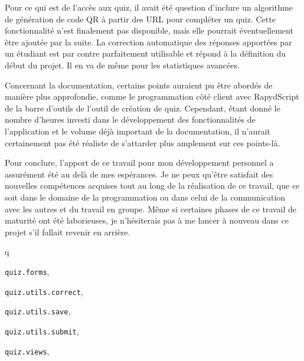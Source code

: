 \documentclass[a4,10pt,french]{sphinxmanual}
\begin{document}
Pour ce qui est de l'accès aux quiz, il avait été question d'inclure un algorithme
de génération de code QR à partir des URL pour compléter un quiz. Cette fonctionnalité
n'est finalement pas disponible, mais elle pourrait éventuellement être ajoutée par la suite.
La correction automatique des réponses apportées par un étudiant est par contre
parfaitement utilisable et répond à la définition du début du projet. Il en va de même
pour les statistiques avancées.

Concernant la documentation, certains points auraient pu être abordés de manière
plus approfondie, comme le programmation côté client avec RapydScript de la barre
d'outils de l'outil de création de quiz. Cependant, étant donné le nombre d'heures
investi dans le développement des fonctionnalités de l'application et le volume
déjà important de la documentation, il n'aurait certainement pas été réaliste de
s'attarder plus amplement sur ces points-là.

Pour conclure, l'apport de ce travail pour mon développement personnel a assurément
été au delà de mes espérances. Je ne peux qu'être satisfait des nouvelles compétences acquises
tout au long de la réalisation de ce travail, que ce soit dans le domaine de la programmation
ou dans celui de la communication avec les autres et du travail en groupe. Même si certaines
phases de ce travail de maturité ont été laborieuses, je n'hésiterais pas à me lancer
à nouveau dans ce projet s'il fallait revenir en arrière.


\renewcommand{\indexname}{Index des modules Python}
\begin{theindex}
\def\bigletter#1{{\Large\sffamily#1}\nopagebreak\vspace{1mm}}
\bigletter{q}
\item {\texttt{quiz.forms}}, \pageref{source:module-quiz.forms}
\item {\texttt{quiz.utils.correct}}, \pageref{source:module-quiz.utils.correct}
\item {\texttt{quiz.utils.save}}, \pageref{source:module-quiz.utils.save}
\item {\texttt{quiz.utils.submit}}, \pageref{source:module-quiz.utils.submit}
\item {\texttt{quiz.views}}, \pageref{source:module-quiz.views}
\end{theindex}

\renewcommand{\indexname}{Index}
\printindex
\end{document}
